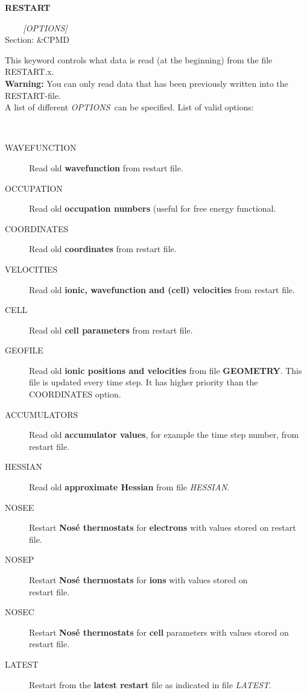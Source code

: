 \documentclass[twoside,10pt,titlepage,a4paper]{article}
\newcommand{\reflabel}[1]{\hypertarget{#1}}
\newcommand{\reflabel}[1]{\label{#1}}
\newcommand{\keyword}[5]{%
\vspace{1.0cm}
\begin{minipage}{15cm}
\reflabel{#1}{\textbf{\large #1}}%
\index{#1}%
\ \textbf{#2}%
\ \textbf{#3}%
\ \textit{#4}%
     \hfill\\\smallskip
     {Section: #5}
     \hfill\\\smallskip\vskip 10pt
\end{minipage}
}%
\newcommand{\desc}[1]{%
   \hspace*{\fill} \parbox{130mm}{\sloppy
                          {#1}%
                             }
     \hfill\\\smallskip
   }%
\newcommand{\desc}[1]{#1\vspace{1ex}}
\begin{document}
\keyword{RESTART}{}{}{[{\it OPTIONS}]}{\&CPMD}
  \desc{This keyword controls what data is read (at the beginning)
      from the file RESTART.x.\\
      {\bf Warning:} You can only read data that has been previously
      written into the RESTART-file.\\
      A list of different {\it OPTIONS}\ can be specified.
      List of valid options:}
      \begin{description}
         \item[WAVEFUNCTION]
               Read old {\bf wavefunction} from restart file.
         \item[OCCUPATION]
               Read old {\bf occupation numbers} (useful for free energy
               functional.
         \item[COORDINATES]
               Read old {\bf coordinates} from restart file.
         \item[VELOCITIES]
               Read old {\bf ionic, wavefunction and (cell) velocities}
               from restart file.
         \item[CELL]
               Read old {\bf cell parameters} from restart file.
         \item[GEOFILE]
               Read old {\bf ionic positions and velocities} from
               file {\bf GEOMETRY}. This file is updated
               every time step. It has higher priority than
               the COORDINATES option.
         \item[ACCUMULATORS]
               Read old {\bf accumulator values}, for example the time step number, from restart file.
         \item[HESSIAN]
               Read old {\bf approximate Hessian} from file {\em HESSIAN}.
         \item[NOSEE]
               Restart {\bf Nos\'e thermostats} for {\bf electrons} with
               values stored on restart file.
         \item[NOSEP]
               Restart {\bf Nos\'e thermostats} for {\bf ions} with
               values stored on \\ restart file.
         \item[NOSEC]
               Restart {\bf Nos\'e thermostats} for {\bf cell}
               parameters with values stored on restart file.
         \item[LATEST]
               Restart from the {\bf latest restart} file as indicated
               in file {\em LATEST}.

\end{description}
\end{document}
